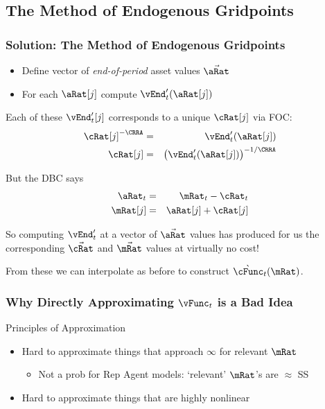\documentclass{beamer}
\begin{document}

\subsection{The Method of Endogenous Gridpoints}
\begin{frame}
\frametitle{Solution: The Method of Endogenous Gridpoints}

\pause 

\begin{itemize}
\item Define vector of {\it end-of-period} asset values $\vec{\aRat}$
\item For each $\aRat[j]$ compute $\vEnd_{t}^{\prime}(\aRat[j])$
\end{itemize}

\pause 

Each of these $\vEnd_{t}^{\prime}[j]$ corresponds to a unique
$\cRat[j]$ via FOC:
\begin{eqnarray}
  \cRat[j]^{-\CRRA} & = & \vEnd_{t}^{\prime}(\aRat[j])
\\ \cRat[j] & = & \left(\vEnd_{t}^{\prime}(\aRat[j])\right)^{-1/\CRRA}
\end{eqnarray}

\pause 

But the DBC says
\begin{eqnarray}
  \aRat_{t} & = & \mRat_{t} - \cRat_{t}
\\ \mRat[j] & = & \aRat[j]+\cRat[j]
\end{eqnarray}

\pause 
So computing $\vEnd_{t}^{\prime}$ at a vector of $\vec{\aRat}$ values has produced for us the corresponding $\vec{\cRat}$ and $\vec{\mRat}$ 
values at virtually no cost!  

\pause 
\medskip 
From these we can interpolate as before to construct $\grave{\cFunc}_{t}(\mRat)$.

\end{frame}

\begin{frame}
\frametitle{Why Directly Approximating $\vFunc_{t}$ is a Bad Idea}

Principles of Approximation

\begin{itemize}
\item Hard to approximate things that approach $\infty$ for relevant $\mRat$
\begin{itemize}
\item Not a prob for Rep Agent models: `relevant' $\mRat$'s are $\approx$ SS
\end{itemize}
\item Hard to approximate things that are highly nonlinear 
\end{itemize}

\end{frame}
\end{document}
